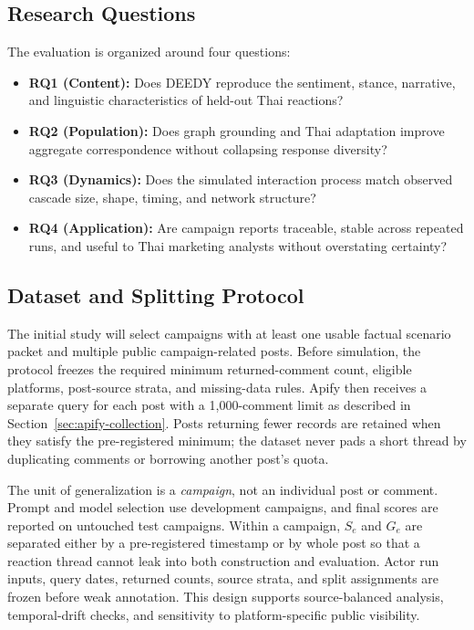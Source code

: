 \documentclass[conference]{IEEEtran}
\begin{document}
\subsection{Research Questions}

The evaluation is organized around four questions:
\begin{itemize}
    \item \textbf{RQ1 (Content):} Does DEEDY reproduce the sentiment, stance,
    narrative, and linguistic characteristics of held-out Thai reactions?
    \item \textbf{RQ2 (Population):} Does graph grounding and Thai adaptation
    improve aggregate correspondence without collapsing response diversity?
    \item \textbf{RQ3 (Dynamics):} Does the simulated interaction process match
    observed cascade size, shape, timing, and network structure?
    \item \textbf{RQ4 (Application):} Are campaign reports traceable, stable
    across repeated runs, and useful to Thai marketing analysts without
    overstating certainty?
\end{itemize}

\subsection{Dataset and Splitting Protocol}

The initial study will select campaigns with at least one usable factual
scenario packet and multiple public campaign-related posts. Before simulation,
the protocol freezes the required minimum returned-comment count, eligible
platforms, post-source strata, and missing-data rules. Apify then receives a
separate query for each post with a 1,000-comment limit as described in
Section~\ref{sec:apify-collection}. Posts returning fewer records are retained
when they satisfy the pre-registered minimum; the dataset never pads a short
thread by duplicating comments or borrowing another post's quota.

The unit of generalization is a \emph{campaign}, not an individual post or
comment. Prompt and model selection use development campaigns, and final
scores are reported on untouched test campaigns. Within a campaign, $S_e$ and
$G_e$ are separated either by a pre-registered timestamp or by whole post so
that a reaction thread cannot leak into both construction and evaluation.
Actor run inputs, query dates, returned counts, source strata, and split
assignments are frozen before weak annotation. This design supports
source-balanced analysis, temporal-drift checks, and sensitivity to
platform-specific public visibility.
\end{document}
